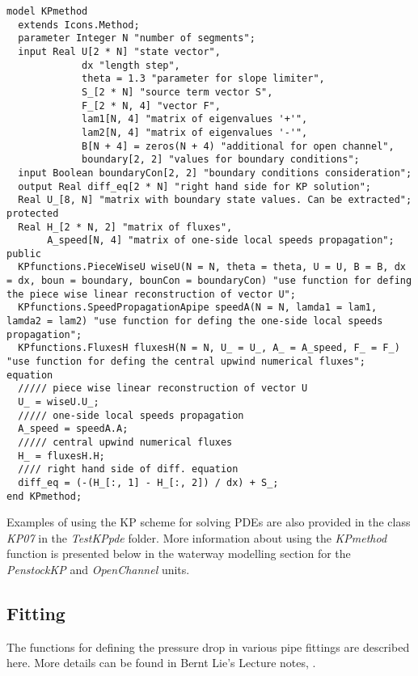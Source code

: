 \documentclass[%
]{USN-PhD}
\begin{document}
\begin{lstlisting}[language = modelica]
model KPmethod
  extends Icons.Method;
  parameter Integer N "number of segments";
  input Real U[2 * N] "state vector",
             dx "length step",
             theta = 1.3 "parameter for slope limiter",
             S_[2 * N] "source term vector S",
             F_[2 * N, 4] "vector F",
             lam1[N, 4] "matrix of eigenvalues '+'",
             lam2[N, 4] "matrix of eigenvalues '-'",
             B[N + 4] = zeros(N + 4) "additional for open channel",
             boundary[2, 2] "values for boundary conditions";
  input Boolean boundaryCon[2, 2] "boundary conditions consideration";
  output Real diff_eq[2 * N] "right hand side for KP solution";
  Real U_[8, N] "matrix with boundary state values. Can be extracted";
protected
  Real H_[2 * N, 2] "matrix of fluxes",
       A_speed[N, 4] "matrix of one-side local speeds propagation";
public
  KPfunctions.PieceWiseU wiseU(N = N, theta = theta, U = U, B = B, dx = dx, boun = boundary, bounCon = boundaryCon) "use function for defing the piece wise linear reconstruction of vector U";
  KPfunctions.SpeedPropagationApipe speedA(N = N, lamda1 = lam1, lamda2 = lam2) "use function for defing the one-side local speeds propagation";
  KPfunctions.FluxesH fluxesH(N = N, U_ = U_, A_ = A_speed, F_ = F_) "use function for defing the central upwind numerical fluxes";
equation
  ///// piece wise linear reconstruction of vector U
  U_ = wiseU.U_;
  ///// one-side local speeds propagation
  A_speed = speedA.A;
  ///// central upwind numerical fluxes
  H_ = fluxesH.H;
  //// right hand side of diff. equation
  diff_eq = (-(H_[:, 1] - H_[:, 2]) / dx) + S_;
end KPmethod;
\end{lstlisting}

Examples of using the KP scheme for solving PDEs are also provided in the class \emph{KP07} in the \emph{TestKPpde} folder. More information about using the \emph{KPmethod} function is presented below in the waterway modelling section for the \emph{PenstockKP} and \emph{OpenChannel} units.

\subsection{Fitting}

The functions for defining the pressure drop in various pipe fittings are described here. More details can be found in Bernt Lie's Lecture notes, \cite{LieL:18}.
\end{document}
